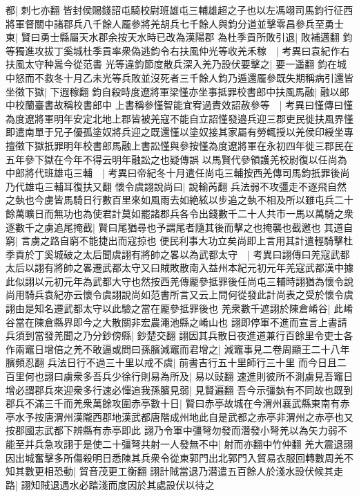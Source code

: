都|{
	刺七亦翻}
皆封侯賜錢詔屯騎校尉班雄屯三輔雄超之子也以左馮翊司馬鈞行征西將軍督關中諸郡兵八千餘人龎參將羌胡兵七千餘人與鈞分道並擊零昌參兵至勇士東|{
	賢曰勇士縣屬天水郡余按天水時已改為漢陽郡}
為杜季貢所敗引退|{
	敗補邁翻}
鈞等獨進攻拔丁奚城杜季貢率衆偽逃鈞令右扶風仲光等收羌禾稼　|{
	考異曰袁紀作右扶風太守种暠今從范書}
光等違鈞節度散兵深入羌乃設伏要擊之|{
	要一遥翻}
鈞在城中怒而不救冬十月乙未光等兵敗並沒死者三千餘人鈞乃遁還龎參既失期稱病引還皆坐徵下獄|{
	下遐稼翻}
鈞自殺時度遼將軍梁慬亦坐事抵罪校書郎中扶風馬融|{
	融以郎中校蘭臺書故稱校書郎中}
上書稱參慬智能宜宥過責效詔赦參等　|{
	考異曰慬傳曰慬為度遼將軍明年安定北地上郡皆被羌寇不能自立詔慬發邉兵迎三郡吏民徙扶風界慬即遣南單于兄子優孤塗奴將兵迎之既還慬以塗奴接其家屬有勞輒授以羌侯印綬坐專擅徵下獄扺罪明年校書郎馬融上書訟慬與參按慬為度遼將軍在永初四年徙三郡民在五年參下獄在今年不得云明年融訟之也疑傳誤}
以馬賢代參領護羌校尉復以任尚為中郎將代班雄屯三輔　|{
	考異曰帝紀冬十月遣任尚屯三輔按西羌傳司馬鈞扺罪後尚乃代雄屯三輔耳復扶又翻}
懷令虞詡說尚曰|{
	說輸芮翻}
兵法弱不攻彊走不逐飛自然之埶也今虜皆馬騎日行數百里來如風雨去如絶絃以步追之埶不相及所以雖屯兵二十餘萬曠日而無功也為使君計莫如罷諸郡兵各令出錢數千二十人共市一馬以萬騎之衆逐數千之虜追尾掩截|{
	賢曰尾猶尋也予謂尾者隨其後而擊之也掩襲也截邀也}
其道自窮|{
	言虜之路自窮不能捷出而寇掠也}
便民利事大功立矣尚即上言用其計遣輕騎擊杜季貢於丁奚城破之太后聞虞詡有將帥之畧以為武都太守　|{
	考異曰詡傳曰羌寇武都太后以詡有將帥之畧遷武都太守又曰賊敗散南入益州本紀元初元年羌寇武都漢中據此似詡以元初元年為武都大守也然按西羌傳龎參抵罪後任尚屯三輔時詡猶為懷令說尚用騎兵袁紀亦云懷令虞詡說尚如范書所言又云上問何從發此計尚表之受於懷令虞詡由是知名遷武都太守以此驗之當在龎參抵罪後也}
羌衆數千遮詡於陳倉崤谷|{
	此崤谷當在陳倉縣界即今之大散關非宏農澠池縣之崤山也}
詡即停軍不進而宣言上書請兵須到當發羌聞之乃分鈔傍縣|{
	鈔楚交翻}
詡因其兵散日夜進道兼行百餘里令吏士各作兩竈日增倍之羌不敢逼或問曰孫臏減竈而君增之|{
	減竈事見二卷周顯王二十八年臏頻忍翻}
兵法日行不過三十里以戒不虞|{
	前書吉行五十里師行三十里}
而今日且二百里何也詡曰虜衆多吾兵少徐行則易為所及|{
	易以䜴翻}
速進則彼所不測虜見吾竈日增必謂郡兵來迎衆多行速必憚追我孫臏見弱|{
	見賢遍翻}
吾今示彊埶有不同故也既到郡兵不滿三千而羌衆萬餘攻圍赤亭數十日|{
	賢曰赤亭故城在今渭州襄武縣東南有赤亭水予按唐渭州漢隴西郡地漢武都唐階成州地此自是武都之赤亭非渭州之赤亭也又按郡國志武都下辨縣有赤亭即此}
詡乃令軍中彊弩勿發而濳發小弩羌以為矢力弱不能至并兵急攻詡于是使二十彊弩共射一人發無不中|{
	射而亦翻中竹仲翻}
羌大震退詡因出城奮擊多所傷殺明日悉陳其兵衆令從東郭門出北郭門入貿易衣服回轉數周羌不知其數更相恐動|{
	貿音茂更工衡翻}
詡計賊當退乃潜遣五百餘人於淺水設伏候其走路|{
	詡知賊退遇水必踏淺而度因於其處設伏以待之}
